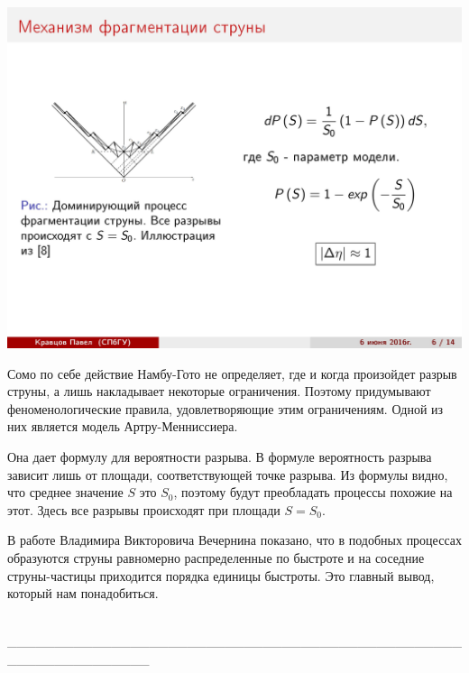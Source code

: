 \documentclass[14pt]{article}
\renewcommand{\line}{\\ \_\_\_\_\_\_\_\_\_\_\_\_\_\_\_\_\_\_\_\_\_\_\_\_\_\_\_\_\_\_\_\_\_\_\_\_\_\_\_\_\_\_\_\_\_\_\_\_\_\_\_\_\_\_\_\_\_\_\_\_\_\_\_ \\ }
\begin{document}
\begin{minipage}[h]{0.35\linewidth}
\includegraphics[width=1\linewidth]{page-06.jpg}
\end{minipage}
\begin{minipage}[h]{0.60\linewidth}
Сомо по себе действие Намбу-Гото не определяет, где и когда произойдет разрыв струны, а лишь накладывает некоторые ограничения. Поэтому придумывают феноменологические правила, удовлетворяющие этим ограничениям. Одной из них является модель Артру-Менниссиера.
 
Она дает формулу для вероятности разрыва. В формуле вероятность разрыва зависит лишь от площади, соответствующей точке разрыва. Из формулы видно, что среднее значение $S$ это $S_0$, поэтому будут преобладать процессы похожие на этот. Здесь все разрывы происходят при площади $S = S_0$. 

В работе Владимира Викторовича Вечернина показано, что в подобных процессах образуются струны равномерно распределенные по быстроте и на соседние струны-частицы приходится порядка единицы быстроты. Это главный вывод, который нам понадобиться.
\end{minipage}
\line

\newpage
$$$$
$$$$
$$$$
$$$$
\end{document}
